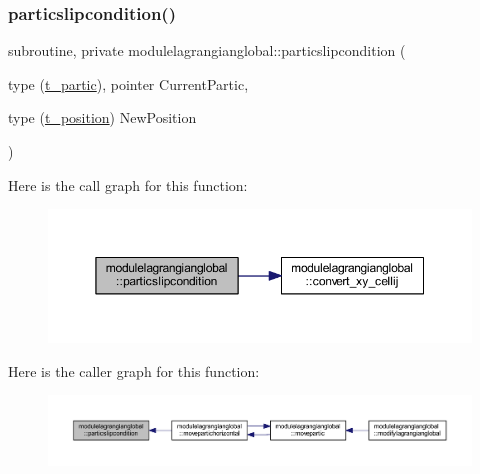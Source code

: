 \subsubsection{\texorpdfstring{particslipcondition()}{particslipcondition()}}
{\footnotesize\ttfamily subroutine, private modulelagrangianglobal\+::particslipcondition (\begin{DoxyParamCaption}\item[{type (\mbox{\hyperlink{structmodulelagrangianglobal_1_1t__partic}{t\+\_\+partic}}), pointer}]{Current\+Partic,  }\item[{type (\mbox{\hyperlink{structmodulelagrangianglobal_1_1t__position}{t\+\_\+position}})}]{New\+Position }\end{DoxyParamCaption})\hspace{0.3cm}{\ttfamily [private]}}

Here is the call graph for this function\+:\nopagebreak
\begin{figure}[H]
\begin{center}
\leavevmode
\includegraphics[width=350pt]{namespacemodulelagrangianglobal_a59c3bacd80d2e9730bbf1bae5ae46304_cgraph}
\end{center}
\end{figure}
Here is the caller graph for this function\+:\nopagebreak
\begin{figure}[H]
\begin{center}
\leavevmode
\includegraphics[width=350pt]{namespacemodulelagrangianglobal_a59c3bacd80d2e9730bbf1bae5ae46304_icgraph}
\end{center}
\end{figure}
\mbox{\label{namespacemodulelagrangianglobal_acb7dabdfc279e06f8231d68f34a4bd76}} 

